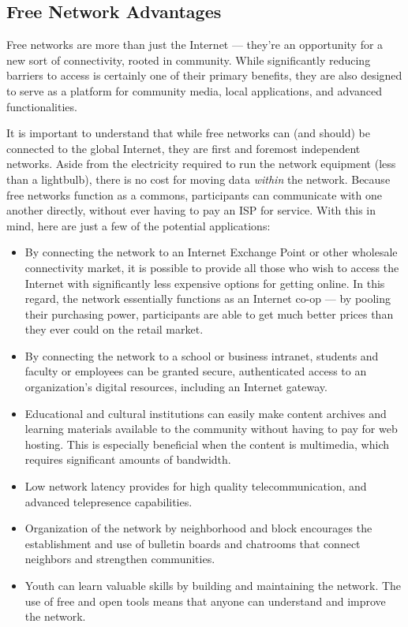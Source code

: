 \subsection{Free Network Advantages}
Free networks are more than just the Internet --- they're an opportunity for a new
sort of connectivity, rooted in community. While significantly reducing barriers
to access is certainly one of their primary benefits, they are also designed to
serve as a platform for community media, local applications, and advanced
functionalities. \par
It is important to understand that while free networks can (and should) be
connected to the global Internet, they are first and foremost independent
networks. Aside from the electricity required to run the network equipment (less
than a lightbulb), there is no cost for moving data \emph{within} the network.
Because free networks function as a commons, participants can communicate
with one another directly, without ever having to pay an ISP for service.
With this in mind, here are just a few of the potential applications:
\begin{itemize}
\itemsep0em
\item By connecting the network to an Internet Exchange Point or other wholesale
connectivity market, it is possible to provide all those who wish to access the
Internet with significantly less expensive options for getting online. In this
regard, the network essentially functions as an Internet co-op --- by pooling
their purchasing power, participants are able to get much better prices than
they ever could on the retail market.
\item By connecting the network to a school or business intranet, students and
faculty or employees can be granted secure, authenticated access to an
organization's digital resources, including an Internet gateway. 
\item Educational and cultural institutions can easily make content archives and
learning materials available to the community without having to pay for web
hosting. This is especially beneficial when the content is multimedia, 
which requires significant amounts of bandwidth.
\item Low network latency provides for high quality telecommunication, and
advanced telepresence capabilities.
\item Organization of the network by neighborhood and block encourages the
establishment and use of bulletin boards and chatrooms that connect neighbors
and strengthen communities.
\item Youth can learn valuable skills by building and maintaining the
network. The use of free and open tools means that anyone can understand
and improve the network.
\end{itemize}

